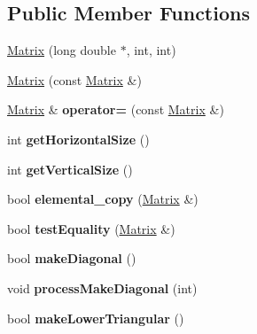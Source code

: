\subsection*{Public Member Functions}
\begin{DoxyCompactItemize}
\item 
\hyperlink{classMatrix_a87eaa30e71330c72883644cd4c8e02e4}{Matrix} (long double $\ast$, int, int)
\item 
\hyperlink{classMatrix_a0b9cfa2302a0273afb1b26e501f93abc}{Matrix} (const \hyperlink{classMatrix}{Matrix} \&)
\item 
\hypertarget{classMatrix_ae3695797299c70849667c22a098db137}{\hyperlink{classMatrix}{Matrix} \& {\bfseries operator=} (const \hyperlink{classMatrix}{Matrix} \&)}\label{classMatrix_ae3695797299c70849667c22a098db137}

\item 
\hypertarget{classMatrix_aeae5f4b0868f3cafa6b09fcc858ada26}{int {\bfseries get\-Horizontal\-Size} ()}\label{classMatrix_aeae5f4b0868f3cafa6b09fcc858ada26}

\item 
\hypertarget{classMatrix_ab91811f4ca83eb1a5bc7fff1c2ca6a95}{int {\bfseries get\-Vertical\-Size} ()}\label{classMatrix_ab91811f4ca83eb1a5bc7fff1c2ca6a95}

\item 
\hypertarget{classMatrix_aa9a89b16ae395f1e30f858ac4271cb88}{bool {\bfseries elemental\-\_\-copy} (\hyperlink{classMatrix}{Matrix} \&)}\label{classMatrix_aa9a89b16ae395f1e30f858ac4271cb88}

\item 
\hypertarget{classMatrix_ac139ec9acccc561d3d2fe4ac96af5570}{bool {\bfseries test\-Equality} (\hyperlink{classMatrix}{Matrix} \&)}\label{classMatrix_ac139ec9acccc561d3d2fe4ac96af5570}

\item 
\hypertarget{classMatrix_ab7d4fad73bde1c8e44420a37396caaac}{bool {\bfseries make\-Diagonal} ()}\label{classMatrix_ab7d4fad73bde1c8e44420a37396caaac}

\item 
\hypertarget{classMatrix_ae16e210b043a7365f86e4caedbddd8e8}{void {\bfseries process\-Make\-Diagonal} (int)}\label{classMatrix_ae16e210b043a7365f86e4caedbddd8e8}

\item 
\hypertarget{classMatrix_a32dde895879cf314fb6a19602ff9b39c}{bool {\bfseries make\-Lower\-Triangular} ()}\label{classMatrix_a32dde895879cf314fb6a19602ff9b39c}


\end{DoxyCompactItemize}
